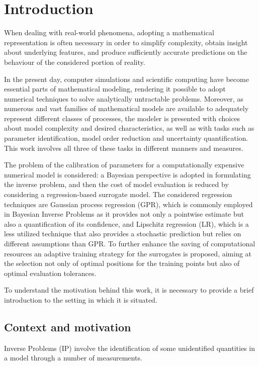 \section{Introduction} \label{sec:intro}

When dealing with real-world phenomena, adopting a mathematical representation is often necessary in order to simplify complexity, obtain insight about underlying features, and produce sufficiently accurate predictions on the behaviour of the considered portion of reality. 

In the present day, computer simulations and scientific computing have become essential parts of mathematical modeling, rendering it possible to adopt numerical techniques to solve analytically untractable problems.
Moreover, as numerous and vast families of mathematical models are available to adequately represent different classes of processes, the modeler is presented with choices about model complexity and desired characteristics, as well as with tasks such as parameter identification, model order reduction and uncertainty quantification. 
This work involves all three of these tasks in different manners and measures. 

The problem of the calibration of parameters for a computationally expensive numerical model is considered: a Bayesian perspective is adopted in formulating the inverse problem, and then the cost of model evaluation is reduced by considering a regression-based surrogate model.
The considered regression techniques are Gaussian process regression (GPR), which is commonly employed in Bayesian Inverse Problems as it provides not only a pointwise estimate but also a quantification of its confidence, and Lipschitz regression (LR), which is a less utilized technique that also provides a stochastic prediction but relies on different assumptions than GPR. 
To further enhance the saving of computational resources an adaptive training strategy for the surrogates is proposed, aiming at the selection not only of optimal positions for the training points but also of optimal evaluation tolerances.

To understand the motivation behind this work, it is necessary to provide a brief introduction to the setting in which it is situated.

\subsection{Context and motivation}\label{sec:context}

Inverse Problems (IP) involve the identification of some unidentified quantities in a model through a number of measurements.

